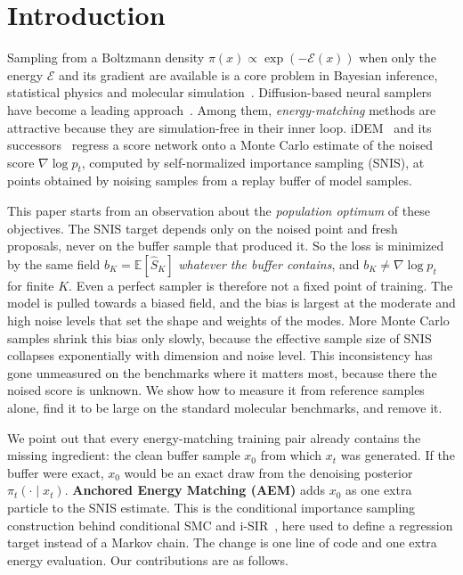 \section{Introduction}
\label{sec:intro}

Sampling from a Boltzmann density $\pi(x)\propto\exp(-\mathcal{E}(x))$ when only the energy $\mathcal{E}$ and its gradient are available is a core problem in Bayesian inference, statistical physics and molecular simulation~\citep{noe2019boltzmann}.
Diffusion-based neural samplers have become a leading approach~\citep{zhang2022path,vargas2023denoising,berner2024optimal,akhound2024iterated}.
Among them, \emph{energy-matching} methods are attractive because they are simulation-free in their inner loop.
iDEM~\citep{akhound2024iterated} and its successors~\citep{bnem2024,iefm2024,cvsi2025,iwsm2025} regress a score network onto a Monte Carlo estimate of the noised score $\nabla\log p_t$, computed by self-normalized importance sampling (SNIS), at points obtained by noising samples from a replay buffer of model samples.

This paper starts from an observation about the \emph{population optimum} of these objectives. The SNIS target depends only on the noised point and fresh proposals, never on the buffer sample that produced it. So the loss is minimized by the same field $b_K=\mathbb{E}[\widehat S_K]$ \emph{whatever the buffer contains}, and $b_K\neq\nabla\log p_t$ for finite $K$.
Even a perfect sampler is therefore not a fixed point of training. The model is pulled towards a biased field, and the bias is largest at the moderate and high noise levels that set the shape and weights of the modes. More Monte Carlo samples shrink this bias only slowly, because the effective sample size of SNIS collapses exponentially with dimension and noise level.
This inconsistency has gone unmeasured on the benchmarks where it matters most, because there the noised score is unknown. We show how to measure it from reference samples alone, find it to be large on the standard molecular benchmarks, and remove it.

We point out that every energy-matching training pair already contains the missing ingredient: the clean buffer sample $x_0$ from which $x_t$ was generated. If the buffer were exact, $x_0$ would be an exact draw from the denoising posterior $\pi_t(\cdot\mid x_t)$. \textbf{Anchored Energy Matching (AEM)} adds $x_0$ as one extra particle to the SNIS estimate. This is the conditional importance sampling construction behind conditional SMC and i-SIR~\citep{andrieu2010particle,andrieu2018uniform}, here used to define a regression target instead of a Markov chain. The change is one line of code and one extra energy evaluation. Our contributions are as follows.

